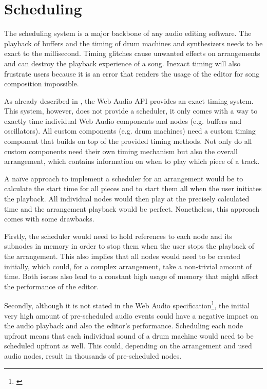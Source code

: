 \section{Scheduling}
\label{sec:impl-scheduling}

The scheduling system is a major backbone of any audio editing software. The playback of buffers and the timing of drum machines and synthesizers needs to be exact to the millisecond. Timing glitches cause unwanted effects on arrangements and can destroy the playback experience of a song. Inexact timing will also frustrate users because it is an error that renders the usage of the editor for song composition impossible.

As already described in , the Web Audio API provides an exact timing system. This system, however, does not provide a scheduler, it only comes with a way to exactly time individual Web Audio components and nodes (e.g. buffers and oscillators). All custom components (e.g. drum machines) need a custom timing component that builds on top of the provided timing methods. Not only do all custom components need their own timing mechanism but also the overall arrangement, which contains information on when to play which piece of a track.

A na\"ive approach to implement a scheduler for an arrangement would be to calculate the start time for all pieces and to start them all when the user initiates the playback. All individual nodes would then play at the precisely calculated time and the arrangement playback would be perfect. Nonetheless, this approach comes with some drawbacks.

Firstly, the scheduler would need to hold references to each node and its subnodes in memory in order to stop them when the user stops the playback of the arrangement. This also implies that all nodes would need to be created initially, which could, for a complex arrangement, take a non-trivial amount of time. Both issues also lead to a constant high usage of memory that might affect the performance of the editor.

Secondly, although it is not stated in the Web Audio specification\footnote{\cite{wilson2014webaudiospec}}, the initial very high amount of pre-scheduled audio events could have a negative impact on the audio playback and also the editor's performance. Scheduling each node upfront means that each individual sound of a drum machine would need to be scheduled upfront as well. This could, depending on the arrangement and used audio nodes, result in thousands of pre-scheduled nodes.

